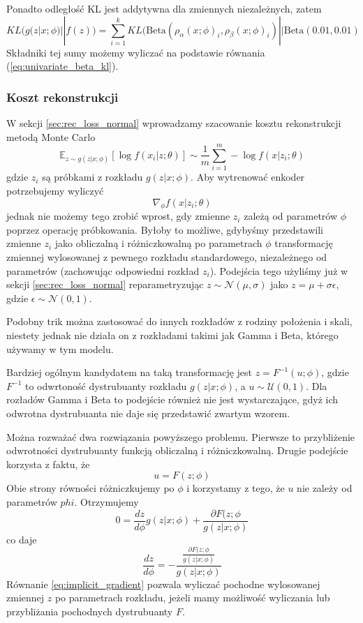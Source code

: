 \documentclass{iithesis}
\begin{document}
Ponadto odległość KL jest addytywna dla zmiennych niezależnych, zatem
\begin{equation*}
KL(g(z|x;\phi) || f(z)) = \sum_{i=1}^k
KL(\text{Beta}(\rho_\alpha(x;\phi)_i,\rho_\beta(x;\phi)_i) || \text{Beta}(0.01,0.01)
\end{equation*}
Składniki tej sumy możemy wyliczać na podstawie równania (\ref{eq:univariate_beta_kl}).

\subsubsection{Koszt rekonstrukcji} \label{sec:rec_loss_beta}
W sekcji \ref{sec:rec_loss_normal} wprowadzamy szacowanie kosztu rekonstrukcji metodą Monte Carlo
$$
\mathbb{E}_{z\sim g(z|x;\phi)}\left[\log f(x_i|z;\theta)\right] \sim
\frac{1}{m} \sum_{i=1}^m -\log f(x|z_i;\theta)
$$
gdzie $z_i$ są próbkami z rozkładu $g(z|x;\phi)$. Aby wytrenować enkoder potrzebujemy wyliczyć
$$
\nabla_\phi f(x|z_i;\theta)
$$
jednak nie możemy tego zrobić wprost, gdy zmienne $z_i$ zależą od parametrów $\phi$ poprzez
operację próbkowania. Byłoby to możliwe, gdybyśmy przedstawili zmienne $z_i$ jako
obliczalną i różniczkowalną po parametrach $\phi$ transformację
zmiennej wylosowanej z pewnego rozkładu standardowego, niezależnego od parametrów
(zachowując odpowiedni rozkład $z_i$). Podejścia tego użyliśmy już w sekcji \ref{sec:rec_loss_normal}
reparametryzując $z \sim \mathcal{N}(\mu, \sigma)$ jako $z=\mu + \sigma \epsilon$,
gdzie $\epsilon \sim \mathcal{N}(0, 1)$.

Podobny trik można zastosować do innych rozkładów z rodziny położenia i skali, niestety
jednak nie działa on z rozkładami takimi jak Gamma i Beta, którego używamy w tym modelu.

Bardziej ogólnym kandydatem na taką transformację jest $z = F^{-1}(u;\phi)$,
gdzie $F^{-1}$ to odwrtoność dystrubuanty rozkładu $g(z|x;\phi)$, a $u \sim \mathcal{U}(0, 1)$.
Dla rozładów Gamma i Beta to podejście również nie jest wystarczające, gdyż
ich odwrotna dystrubuanta nie daje się przedstawić zwartym wzorem.

Można rozważać dwa rozwiązania powyższego problemu. Pierwsze to przybliżenie
odwrotności dystrubuanty funkcją obliczalną i różniczkowalną.
Drugie podejście korzysta z faktu, że
$$
u = F(z;\phi)
$$
Obie strony równości różniczkujemy po $\phi$ i korzystamy z tego, że $u$ nie zależy od parametrów $phi$.
Otrzymujemy
$$
0 = \frac{dz}{d\phi}g(z|x;\phi)+\frac{\partial F(z;\phi}{g(z|x;\phi)}
$$
co daje
\begin{equation} \label{eq:implicit_gradient}
\frac{dz}{d\phi} = -\frac{\frac{\partial F(z;\phi}{g(z|x;\phi)}}{g(z|x;\phi)}
\end{equation}
Równanie \ref{eq:implicit_gradient} pozwala wyliczać pochodne wylosowanej zmiennej $z$
po parametrach rozkładu, jeżeli mamy możliwość wyliczania lub przybliżania pochodnych
dystrubuanty $F$.
\end{document}
